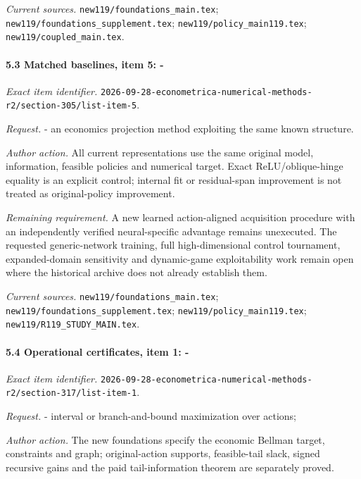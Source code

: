 \par\emph{Current sources.} \nolinkurl{new119/foundations_main.tex}; \nolinkurl{new119/foundations_supplement.tex}; \nolinkurl{new119/policy_main119.tex}; \nolinkurl{new119/coupled_main.tex}.

\paragraph{5.3 Matched baselines, item 5: -}

\emph{Exact item identifier.} \nolinkurl{2026-09-28-econometrica-numerical-methods-r2/section-305/list-item-5}.

\par\emph{Request.} - an economics projection method exploiting the same known structure.

\par\emph{Author action.} All current representations use the same original model, information, feasible policies and numerical target. Exact ReLU/\allowbreak{}oblique-hinge equality is an explicit control; internal fit or residual-span improvement is not treated as original-policy improvement.

\par\emph{Remaining requirement.} A new learned action-aligned acquisition procedure with an independently verified neural-specific advantage remains unexecuted. The requested generic-network training, full high-dimensional control tournament, expanded-domain sensitivity and dynamic-game exploitability work remain open where the historical archive does not already establish them.

\par\emph{Current sources.} \nolinkurl{new119/foundations_main.tex}; \nolinkurl{new119/foundations_supplement.tex}; \nolinkurl{new119/policy_main119.tex}; \nolinkurl{new119/R119_STUDY_MAIN.tex}.

\paragraph{5.4 Operational certificates, item 1: -}

\emph{Exact item identifier.} \nolinkurl{2026-09-28-econometrica-numerical-methods-r2/section-317/list-item-1}.

\par\emph{Request.} - interval or branch-and-bound maximization over actions;

\par\emph{Author action.} The new foundations specify the economic Bellman target, constraints and graph; original-action supports, feasible-tail slack, signed recursive gains and the paid tail-information theorem are separately proved.

